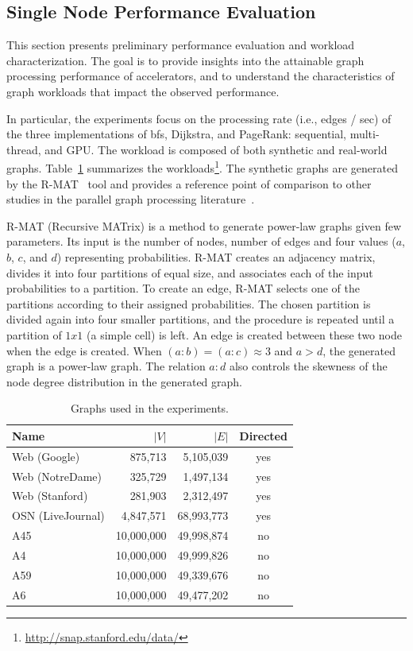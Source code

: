 \subsection{Single Node Performance Evaluation}
\label{sec:evaluation}

This section presents preliminary performance evaluation and workload characterization. The goal is to provide insights into the attainable graph processing performance of accelerators, and to understand the characteristics of graph workloads that impact the observed performance. 

In particular, the experiments focus on the processing rate (i.e., edges / sec) of the three implementations of {\sc bfs}, Dijkstra, and PageRank: sequential, multi-thread, and GPU. The workload is composed of both synthetic and real-world graphs. Table~\ref{tab:workload} summarizes the workloads\footnote{\url{http://snap.stanford.edu/data/}}. The synthetic graphs are generated by the R-MAT~\cite{rmat-paper} tool and provides a reference point of comparison to other studies in the parallel graph processing literature~\cite{ref1, ref2}.

R-MAT (Recursive MATrix) \cite{rmat} is a method to generate power-law graphs given few parameters. Its input is the number of nodes, number of edges and four values ($a$, $b$, $c$, and $d$) representing probabilities. R-MAT creates an adjacency matrix, divides it into four partitions of equal size, and associates each of the input probabilities to a partition. To create an edge, R-MAT selects one of the partitions according to their assigned probabilities. The chosen partition is divided again into four smaller partitions, and the procedure is repeated until a partition of $1 x 1$ (a simple cell) is left. An edge is created between these two node when the edge is created. When $(a : b) = (a : c) \approx 3$ and $a > d$, the generated graph is a power-law graph. The relation $a : d$ also controls the skewness of the node degree distribution in the generated graph.

\begin{table}[ht]
\centering
\begin{tabular}{l|r|r|c}
Name              & $|V|$   & $|E|$      & Directed \\\hline
Web (Google)      & 875,713 & 5,105,039  & yes      \\\hline
Web (NotreDame)   & 325,729 & 1,497,134  & yes      \\\hline
Web (Stanford)    & 281,903 & 2,312,497  & yes      \\\hline
OSN (LiveJournal) & 4,847,571 & 68,993,773 & yes    \\\hline
A45         & 10,000,000 & 49,998,874 & no \\\hline
A4          & 10,000,000 & 49,999,826 & no \\\hline
A59         & 10,000,000 & 49,339,676 & no \\\hline
A6          & 10,000,000 & 49,477,202 & no \\\hline
\end{tabular}
\caption{Graphs used in the experiments.}
\label{tab:workload}
\end{table}

